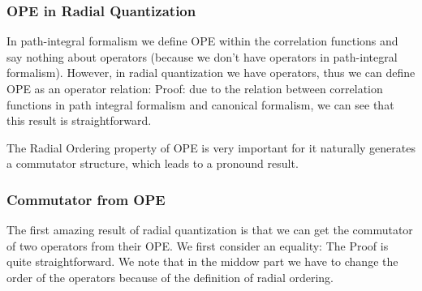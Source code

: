 \subsubsection{OPE in Radial Quantization}

In path-integral formalism we define OPE within the correlation
functions and say nothing about operators (because we don't have
operators in path-integral formalism). However, in radial
quantization we have operators, thus we can define OPE as an operator relation:
Proof: due to the relation between correlation functions in path
integral formalism and canonical formalism, we can see that this
result is straightforward.

The Radial Ordering property of OPE is very important for it
naturally generates a commutator structure, which leads to a pronound result.

\subsubsection{Commutator from OPE}

The first amazing result of radial quantization is that we can get
the commutator of two operators from their OPE. We first consider an equality:
The Proof is quite straightforward. We note that in the middow part
we have to change the order of the operators because of the
definition of radial ordering.

